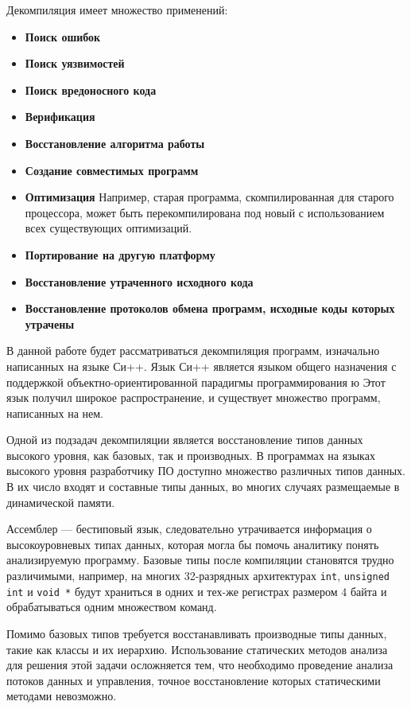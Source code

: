 \documentclass[a4paper,12pt,russian]{article}
\begin{document}
Декомпиляция имеет множество применений:
\begin{itemize}
\item{\textbf{Поиск ошибок}}
\item{\textbf{Поиск уязвимостей}}
\item{\textbf{Поиск вредоносного кода}}
\item{\textbf{Верификация}}
\item{\textbf{Восстановление алгоритма работы}}
\item{\textbf{Создание совместимых программ}}
\item{\textbf{Оптимизация}} Например, старая программа, скомпилированная для старого процессора, может быть перекомпилирована под новый с использованием всех существующих оптимизаций.
\item{\textbf{Портирование на другую платформу}}
\item{\textbf{Восстановление утраченного исходного кода}}
\item{\textbf{Восстановление протоколов обмена программ, исходные коды которых утрачены}}
\end{itemize}

В данной работе будет рассматриваться декомпиляция программ, изначально написанных на языке Си++.
Язык Си++ является языком общего назначения с поддержкой объектно-ориентированной парадигмы программирования \cite{strstr}ю Этот язык получил широкое распространение, и существует множество программ, написанных на нем.

Одной из подзадач декомпиляции является восстановление типов данных высокого уровня, как базовых, так и производных.
В программах на языках высокого уровня разработчику ПО доступно множество различных типов данных.
В их число входят и составные типы данных, во многих случаях размещаемые в динамической памяти.

Ассемблер --- бестиповый язык, следовательно утрачивается информация о высокоуровневых типах данных, которая могла бы помочь аналитику понять анализируемую программу.
Базовые типы после компиляции становятся трудно различимыми, например, на многих 32-разрядных архитектурах \texttt{int}, \texttt{unsigned int} и \texttt{void *} будут храниться в одних и тех-же регистрах размером 4 байта и обрабатываться одним множеством команд.

Помимо базовых типов требуется восстанавливать производные типы данных, такие как классы и их иерархию.
Использование статических методов анализа для решения этой задачи осложняется
тем, что необходимо проведение анализа потоков данных и управления, точное восстановление которых статическими методами невозможно.
\end{document}
